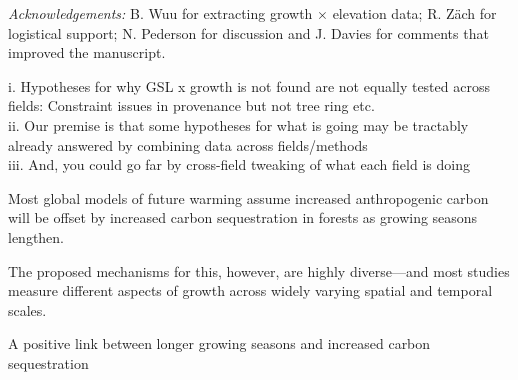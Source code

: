 \documentclass[11pt]{article}
\begin{document}


\emph{Acknowledgements:} B. Wuu for extracting growth $\times$ elevation data; R. Z{\"a}ch for logistical support; N. Pederson for discussion and J. Davies for comments that improved the manuscript. 

\iffalse

i. Hypotheses for why GSL x growth is not found are not equally tested across fields: Constraint issues in provenance but not tree ring etc.\\
ii. Our premise is that some hypotheses for what is going may be tractably already answered by combining data across fields/methods\\
iii. And, you could go far by cross-field tweaking of what each field is doing

Most global models of future warming assume increased anthropogenic carbon will be offset by increased carbon sequestration in forests as growing seasons lengthen.

The proposed mechanisms for this, however, are highly diverse---and most studies measure different aspects of growth across widely varying spatial and temporal scales. 

A positive link between longer growing seasons and increased carbon sequestration 
\end{document}
